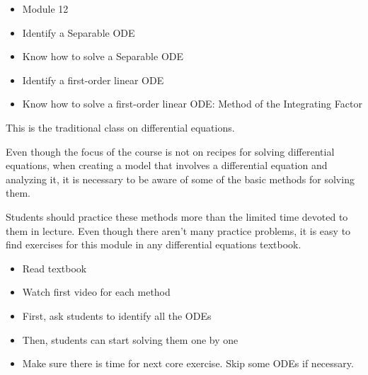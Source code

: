 \begin{lesson}

	\begin{itemize}
		\item Module 12
	\end{itemize}

	\begin{itemize}
		\item Identify a Separable ODE
		\item Know how to solve a Separable ODE
		\item Identify a first-order linear ODE
		\item Know how to solve a first-order linear ODE: Method of the Integrating Factor
	\end{itemize}
	

This is the traditional class on differential equations. 

Even though the focus of the course is not on recipes for solving differential equations, when creating a model that involves a differential equation and analyzing it, it is necessary to be aware of some of the basic methods for solving them. 

Students should practice these methods more than the limited time devoted to them in lecture. Even though there aren't many practice problems, it is easy to find exercises for this module in any differential equations textbook.

\begin{itemize}
	\item Read textbook
	\item Watch first video for each method
\end{itemize}


\end{lesson}






\begin{annotation}
\begin{goals}
	\begin{itemize}
		\item First, ask students to identify all the ODEs
		\item Then, students can start solving them one by one \\
	\end{itemize}
\end{goals}	
\begin{notes}
	\begin{itemize}
		\item Make sure there is time for next core exercise. Skip some ODEs if necessary.
	\end{itemize}	
\end{notes}
\end{annotation}

